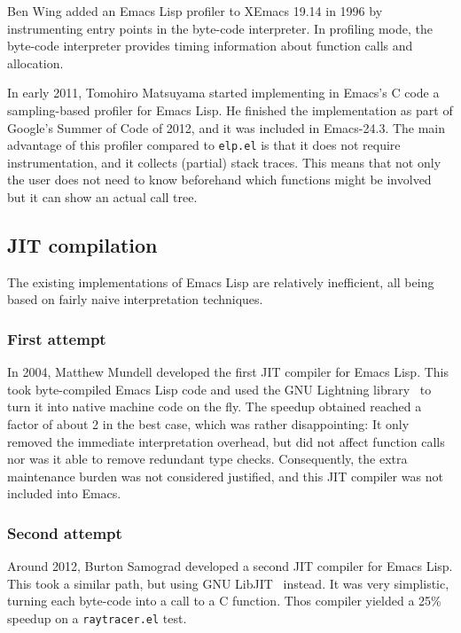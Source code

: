 \documentclass[format=acmsmall, review]{acmart}
\newcommand \Elisp {Emacs Lisp}
\begin{document}
Ben Wing added an \Elisp{} profiler to XEmacs 19.14 in
1996 by instrumenting entry points in the byte-code interpreter.
In profiling mode, the byte-code interpreter provides timing
information about function calls and allocation.

In early 2011, Tomohiro Matsuyama started implementing in Emacs's C code
a sampling-based profiler for \Elisp{}.  He finished the implementation as
part of Google's Summer of Code of 2012, and it was included in Emacs-24.3.
The main advantage of this profiler compared to \texttt{elp.el} is that it
does not require instrumentation, and it collects (partial) stack traces.
This means that not only the user does not need to know beforehand which
functions might be involved but it can show an actual call tree.

\subsection{JIT compilation}
\label{sec:jit}

The existing implementations of \Elisp{} are relatively inefficient, all
being based on fairly naive interpretation techniques.

\subsubsection{First attempt}
In 2004, Matthew Mundell developed the first JIT compiler for \Elisp.
This took byte-compiled \Elisp{} code and used the GNU Lightning
library~\cite{GNULightning} to turn it into native machine code on the
fly.  The speedup obtained reached a factor of about 2 in the best
case, which was rather disappointing: It only removed the immediate
interpretation overhead, but did not affect function calls nor was it
able to remove redundant type checks.  Consequently, the extra
maintenance burden was not considered justified, and this JIT compiler
was not included into Emacs.

\subsubsection{Second attempt}
Around 2012, Burton Samograd developed a second JIT compiler for \Elisp.
This took a similar path, but using GNU LibJIT~\cite{GNULibjit} instead.  It was very
simplistic, turning each byte-code into a call to a C function.
Thos compiler yielded a 25\% speedup on a \texttt{raytracer.el} test.
\end{document}
